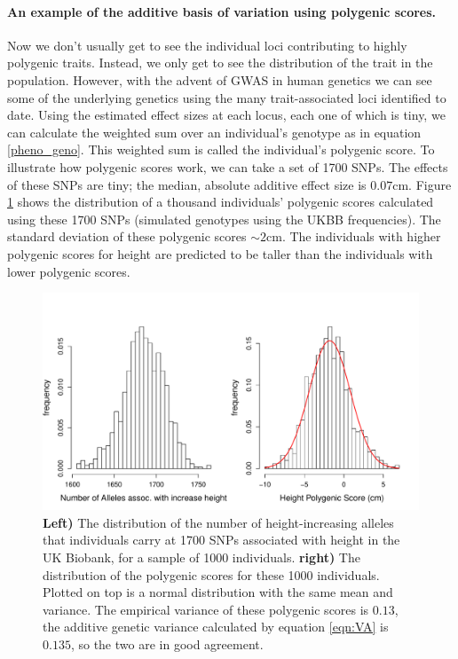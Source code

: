 \paragraph{An example of the additive basis of variation using polygenic scores.}
Now we don't usually get to see the individual loci contributing to
highly polygenic traits. Instead, we only get to see the distribution
of the trait in the population. However, with the advent of GWAS in
human genetics we can see some of the underlying genetics using the
many trait-associated loci identified to date. Using the estimated
effect sizes at each locus, each one of which is tiny, we can
calculate the weighted sum over an individual's genotype as in
equation \ref{pheno_geno}. This weighted sum is called the
individual's polygenic score. To illustrate how polygenic scores work,
we can take a set of 1700 SNPs. The effects of these SNPs are tiny; the median, absolute additive effect size is $0.07$cm. Figure \ref{fig:Biobank_height_PGS} shows the distribution of a thousand individuals' polygenic scores calculated using these 1700 SNPs (simulated genotypes using the UKBB frequencies). The standard deviation of these polygenic scores $\sim 2$cm. 
The individuals with higher polygenic scores for height are predicted to be taller than the individuals with lower polygenic scores. 
\begin{figure}
\begin{center}
\includegraphics[width=\textwidth]{figures/Biobank_height_dist.pdf}
\end{center}
\caption{{\bf Left)} The distribution of the number of
  height-increasing alleles that individuals carry at 1700 SNPs
  associated with height in the UK Biobank, for a sample of 1000
  individuals. {\bf right)} The distribution of the polygenic scores
  for these 1000 individuals. Plotted on top is a normal distribution
  with the same mean and variance. The empirical variance of these
  polygenic scores is $0.13$, the additive genetic variance calculated
  by equation \eqref{eqn:VA} is $0.135$, so the two are in good
  agreement.  } \label{fig:Biobank_height_PGS}
\end{figure}
 

